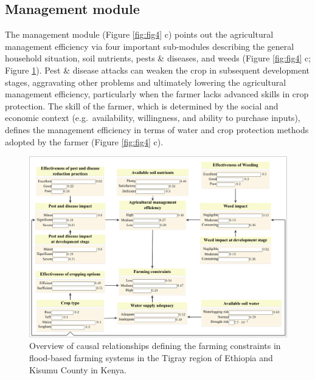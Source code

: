 \documentclass[]{elsarticle} %
\begin{document}
\hypertarget{ref45}{%
\subsection{Management module}\label{ref45}}

The management module (Figure \ref{fig:fig4} c) points out the agricultural management efficiency via four important sub-modules describing the general household situation, soil nutrients, pests \& diseases, and weeds (Figure \ref{fig:fig4} c; Figure \ref{fig:fig9}). Pest \& disease attacks can weaken the crop in subsequent development stages, aggravating other problems and ultimately lowering the agricultural management efficiency, particularly when the farmer lacks advanced skills in crop protection. The skill of the farmer, which is determined by the social and economic context (e.g.~availability, willingness, and ability to purchase inputs), defines the management efficiency in terms of water and crop protection methods adopted by the farmer (Figure \ref{fig:fig4} c).

\begin{figure}[!h]

{\centering \includegraphics[width=1\linewidth,]{Modelling_FBFS_files/figure-latex/fig9-plot-1} 

}

\caption{Overview of causal relationships defining the farming constraints in flood-based farming systems in the Tigray region of Ethiopia and Kisumu County in Kenya.}\label{fig:fig9}
\end{figure}
\end{document}

